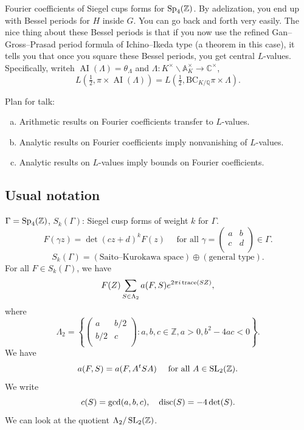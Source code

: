 \documentclass[reqno]{amsart} 
\begin{document}
Fourier coefficients of Siegel cups forms for $\operatorname{Sp}_4(\mathbb{Z})$.  By adelization, you end up with Bessel periods for $H$ inside $G$.  You can go back and forth very easily.  The nice thing about these Bessel periods is that if you now use the refined Gan--Gross--Prasad period formula of Ichino--Ikeda type (a theorem in this case), it tells you that once you square these Bessel periods, you get central $L$-values.  Specifically, writeh $\operatorname{AI}(\Lambda) = \theta_\Lambda$ and $\Lambda : K^\times \backslash \mathbb{A}_K^\times \rightarrow \mathbb{C}^\times$,
\begin{equation*}
  L(\tfrac{1}{2}, \pi \times \operatorname{AI}(\Lambda))
  =
  L(\tfrac{1}{2}, \mathrm{BC}_{K/\mathbb{Q}} \pi \times \Lambda).
\end{equation*}

Plan for talk:
\begin{enumerate}[(a)]
\item Arithmetic results on Fourier coefficients transfer to $L$-values.
\item Analytic results on Fourier coefficients imply nonvanishing of $L$-values.
\item Analytic results on $L$-values imply bounds on Fourier coefficients.
\end{enumerate}

\subsection{Usual notation}
$\Gamma = \operatorname{Sp}_4(\mathbb{Z})$, $S_k(\Gamma)$: Siegel cusp forms of weight $k$ for $\Gamma$.
\begin{equation*}
  F(\gamma z) = \det(c z + d)^k F(z) \quad \text{ for all } \gamma =
  \begin{pmatrix}
    a    & b \\
    c & d \\
  \end{pmatrix} \in \Gamma.
\end{equation*}
\begin{equation*}
  S_k(\Gamma) =(\text{Saito--Kurokawa space}) \oplus(\text{general type}).
\end{equation*}
For all $F \in S_k(\Gamma)$, we have
\begin{equation*}
  F(Z) \sum_{S \in \Lambda_2} a(F, S) e^{2 \pi i \operatorname{trace}(S Z)},
\end{equation*}
where
\begin{equation*}
  \Lambda_2 = \left\{
    \begin{pmatrix}
      a      & b/2 \\
      b/2 & c \\
    \end{pmatrix} : a, b, c \in \mathbb{Z}, a > 0, b^2 - 4 a c < 0 \right\}.
\end{equation*}
We have
\begin{equation*}
  a(F, S) = a(F, A^t S A) \quad \text{ for all } A \in \operatorname{SL}_2(\mathbb{Z}).
\end{equation*}
We write
\begin{equation*}
  c(S) = \gcd(a,b,c),
  \quad \operatorname{disc}(S) = - 4 \det(S).
\end{equation*}
We can look at the quotient $\Lambda_2 / \operatorname{SL}_2(\mathbb{Z})$.
\end{document}
